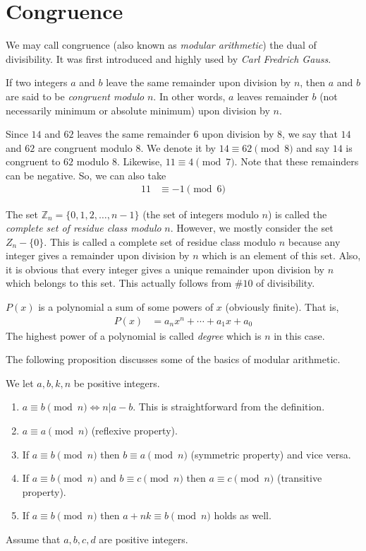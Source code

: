 \documentclass{subfile}
\begin{document}
	\section{Congruence}
		We may call congruence (also known as \textit{modular arithmetic}) the dual of divisibility. It was first introduced and highly
		used by \textit{Carl Fredrich Gauss}.
			\begin{definition}
				If two integers $a$ and $b$ leave the same remainder upon division by $n$, then $a$ and $b$ are said to be \textit{congruent modulo} $n$. In other words, $a$ leaves remainder $b$ (not necessarily minimum or absolute minimum) upon division by $n$.
			\end{definition}
			
			\begin{example}
				Since $14$ and $62$ leaves the same remainder $6$ upon division by $8$, we say that $14$ and $62$ are congruent modulo $8$. We denote it by $14\equiv62\pmod8$ and say $14$ is congruent to $62$ modulo $8$. Likewise, $11\equiv4\pmod7$. Note that these remainders can be negative. So, we can also take
					\begin{align*}
						11 & \equiv-1\pmod6
					\end{align*}
			\end{example}
		The set $\mathbb{Z}_n=\{0,1,2,\ldots,n-1\}$ (the set of integers modulo $n$) is called the \textit{complete set of residue class modulo} $n$. However, we mostly consider the set $Z_n-\{0\}$. This is called a complete set of residue class modulo $n$ because any integer gives a remainder upon division by $n$ which is an element of this set. Also, it is obvious that every integer gives a unique remainder upon division by $n$ which belongs to this set. This actually follows from $\#10$ of divisibility.
			\begin{definition}
				$P(x)$ is a polynomial a sum of some powers of $x$ (obviously finite). That is,
					\begin{align*}
						P(x) & = a_nx^n+\cdots+a_1x+a_0
					\end{align*}
				The highest power of a polynomial is called \textit{degree} which is $n$ in this case.
			\end{definition}
		The following proposition discusses some of the basics of modular arithmetic.
			\begin{proposition}
				We let $a,b,k,n$ be positive integers.
					\begin{enumerate}[(1)]
						\item $a\equiv b\pmod n\iff n|a-b$. This is straightforward from the definition.
						\item $a\equiv a\pmod n$ (reflexive property).
						\item If $a\equiv b\pmod n$ then $b\equiv a\pmod n$ (symmetric property) and vice versa.
						\item If $a\equiv b\pmod n$ and $b\equiv c\pmod n$ then $a\equiv c\pmod n$ (transitive property).
						\item If $a\equiv b\pmod n$ then $a+nk\equiv b\pmod n$ holds as well.
					\end{enumerate}
			\end{proposition}
			
			\begin{proposition}
				Assume that $a,b,c,d$ are positive integers.
			\end{proposition}
\end{document}
